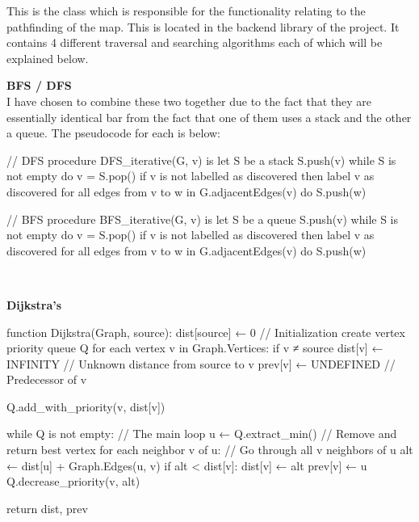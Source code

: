 \begin{FlushLeft}
    This is the class which is responsible for the functionality relating to the pathfinding of the map. This is located in the backend library of the project. It contains 4 different traversal and searching algorithms each of which will be explained below. \\ \bk

    \textbf{BFS / DFS} \\
    I have chosen to combine these two together due to the fact that they are essentially identical bar from the fact that one of them uses a stack and the other a queue. The pseudocode for each is below:\\
    \begin{pseudocode}
// DFS
procedure DFS_iterative(G, v) is
let S be a stack
S.push(v)
while S is not empty do
    v = S.pop()
    if v is not labelled as discovered then
        label v as discovered
        for all edges from v to w in G.adjacentEdges(v) do 
            S.push(w)

// BFS
procedure BFS_iterative(G, v) is
let S be a queue
S.push(v)
while S is not empty do
    v = S.pop()
    if v is not labelled as discovered then
        label v as discovered
        for all edges from v to w in G.adjacentEdges(v) do 
            S.push(w)
    \end{pseudocode} \\ \BK

    \textbf{Dijkstra's} \\
    \begin{pseudocode}
function Dijkstra(Graph, source):
    dist[source] ← 0                           // Initialization
    create vertex priority queue Q
    for each vertex v in Graph.Vertices:
        if v ≠ source
            dist[v] ← INFINITY                 // Unknown distance from source to v
            prev[v] ← UNDEFINED                // Predecessor of v

        Q.add_with_priority(v, dist[v])


    while Q is not empty:                      // The main loop
        u ← Q.extract_min()                    // Remove and return best vertex
        for each neighbor v of u:              // Go through all v neighbors of u
            alt ← dist[u] + Graph.Edges(u, v)
            if alt < dist[v]:
                dist[v] ← alt
                prev[v] ← u
                Q.decrease_priority(v, alt)

    return dist, prev
    \end{pseudocode} \\ \BK


\end{FlushLeft}
